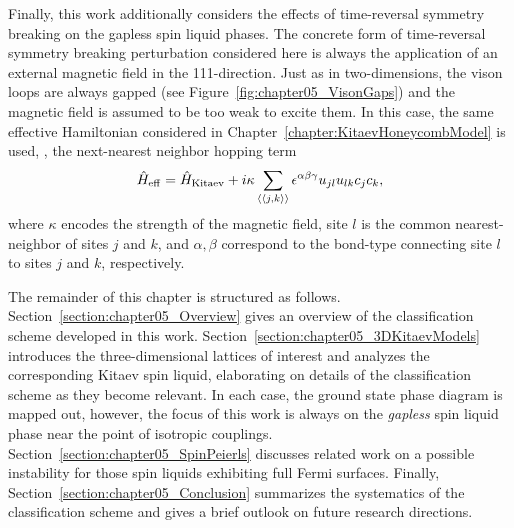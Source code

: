 Finally, this work additionally considers the effects of time-reversal symmetry breaking on the gapless spin liquid phases.
The concrete form of time-reversal symmetry breaking perturbation considered here is always the application of an external magnetic field in the 111-direction.
Just as in two-dimensions, the vison loops are always gapped (see Figure~\ref{fig:chapter05_VisonGaps}) and the magnetic field is assumed to be too weak to excite them.
In this case, the same effective Hamiltonian considered in Chapter~\ref{chapter:KitaevHoneycombModel} is used, \ie, the next-nearest neighbor hopping term
%
\begin{equation}
	\hat{H}_{\rm eff} = \hat{H}_{\rm Kitaev} + i \kappa \sum_{\langle \langle j,k \rangle \rangle} \epsilon^{\alpha\beta\gamma} u_{jl} u_{lk} c_j c_k,
\end{equation}
%
where $\kappa$ encodes the strength of the magnetic field, site $l$ is the common nearest-neighbor of sites $j$ and $k$, and $\alpha, \beta$ correspond to the bond-type connecting site $l$ to sites $j$ and $k$, respectively.

The remainder of this chapter is structured as follows.
Section~\ref{section:chapter05_Overview} gives an overview of the classification scheme developed in this work.
Section~\ref{section:chapter05_3DKitaevModels} introduces the three-dimensional lattices of interest and analyzes the corresponding Kitaev spin liquid, elaborating on details of the classification scheme as they become relevant.
In each case, the ground state phase diagram is mapped out, however, the focus of this work is always on the \textit{gapless} spin liquid phase near the point of isotropic couplings.
Section~\ref{section:chapter05_SpinPeierls} discusses related work on a possible instability for those spin liquids exhibiting full Fermi surfaces.
Finally, Section~\ref{section:chapter05_Conclusion} summarizes the systematics of the classification scheme and gives a brief outlook on future research directions.


%
%
